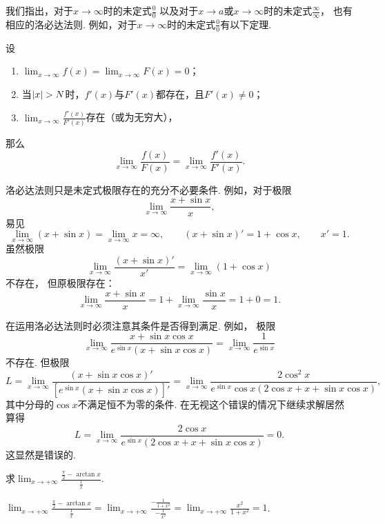 我们指出，对于\(x\to\infty\)时的未定式\(\frac{0}{0}\)
以及对于\(x \to a\)或\(x\to\infty\)时的未定式\(\frac{\infty}{\infty}\)，
也有相应的洛必达法则.
例如，对于\(x\to\infty\)时的未定式\(\frac{0}{0}\)有以下定理.
\begin{theorem}\label{theorem:微分中值定理.洛必达法则2}
设\begin{enumerate}
	\item \(\lim_{x\to\infty} f(x) = \lim_{x\to\infty} F(x) = 0\)；
	\item 当\(\abs{x}>N\)时，\(f'(x)\)与\(F'(x)\)都存在，且\(F'(x) \neq 0\)；
	\item \(\lim_{x\to\infty} \frac{f'(x)}{F'(x)}\)存在（或为无穷大），
\end{enumerate}
那么\[
	\lim_{x\to\infty} \frac{f(x)}{F(x)}
	= \lim_{x\to\infty} \frac{f'(x)}{F'(x)}.
\]
\end{theorem}

\begin{remark}
洛必达法则只是未定式极限存在的充分不必要条件.
例如，对于极限\[
	\lim_{x\to\infty} \frac{x+\sin x}{x},
\]
易见\[
	\lim_{x\to\infty} (x+\sin x)
	= \lim_{x\to\infty} x
	= \infty,
	\qquad
	(x+\sin x)' = 1+\cos x, \qquad
	x' = 1.
\]
虽然极限\[
	\lim_{x\to\infty}\frac{(x+\sin x)'}{x'} = \lim_{x\to\infty}(1+\cos x)
\]不存在，
但原极限存在：\[
	\lim_{x\to\infty} \frac{x+\sin x}{x}
	= 1 + \lim_{x\to\infty} \frac{\sin x}{x}
	= 1 + 0 = 1.
\]
\end{remark}

\begin{remark}
在运用洛必达法则时必须注意其条件是否得到满足.
例如，
极限\[
	\lim_{x\to\infty} \frac{x+\sin x \cos x}{e^{\sin x}(x+\sin x \cos x)}
	= \lim_{x\to\infty} \frac{1}{e^{\sin x}}
\]不存在.
但极限\[
	L = \lim_{x\to\infty} \frac{(x+\sin x \cos x)'}{[e^{\sin x}(x+\sin x \cos x)]'}
	= \lim_{x\to\infty} \frac{2\cos^2 x}{e^{\sin x}\cos x(2\cos x + x + \sin x \cos x)},
\]其中分母的\(\cos x\)不满足恒不为零的条件.
在无视这个错误的情况下继续求解居然算得\[
	L = \lim_{x\to\infty} \frac{2\cos x}{e^{\sin x}(2\cos x + x + \sin x \cos x)} = 0.
\]
这显然是错误的.
\end{remark}

\begin{example}
求\(\lim_{x\to+\infty} \frac{\frac{\pi}{2} - \arctan x}{\frac{1}{x}}\).
\begin{solution}
\(\lim_{x\to+\infty} \frac{\frac{\pi}{2} - \arctan x}{\frac{1}{x}}
= \lim_{x\to+\infty} \frac{-\frac{1}{1+x^2}}{-\frac{1}{x^2}}
= \lim_{x\to+\infty} \frac{x^2}{1+x^2} = 1\).
\end{solution}
\end{example}

